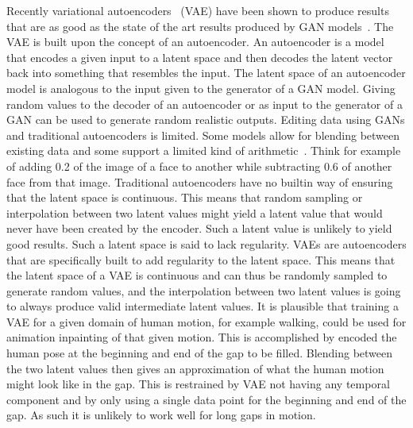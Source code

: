 Recently variational autoencoders~\cite{kingma2014autoencoding} (VAE) have been shown to produce results that are as good as the state of the art results produced by GAN models~\cite{razavi2019generating}. The VAE is built upon the concept of an autoencoder. An autoencoder is a model that encodes a given input to a latent space and then decodes the latent vector back into something that resembles the input. The latent space of an autoencoder model is analogous to the input given to the generator of a GAN model. Giving random values to the decoder of an autoencoder or as input to the generator of a GAN can be used to generate random realistic outputs. Editing data using GANs and traditional autoencoders is limited. Some models allow for blending between existing data and some support a limited kind of arithmetic~\cite{karras2019stylebased}. Think for example of adding 0.2 of the image of a face to another while subtracting 0.6 of another face from that image. Traditional autoencoders have no builtin way of ensuring that the latent space is continuous. This means that random sampling or interpolation between two latent values might yield a latent value that would never have been created by the encoder. Such a latent value is unlikely to yield good results. Such a latent space is said to lack regularity. VAEs are autoencoders that are specifically built to add regularity to the latent space. This means that the latent space of a VAE is continuous and can thus be randomly sampled to generate random values, and the interpolation between two latent values is going to always produce valid intermediate latent values. It is plausible that training a VAE for a given domain of human motion, for example walking, could be used for animation inpainting of that given motion. This is accomplished by encoded the human pose at the beginning and end of the gap to be filled. Blending between the two latent values then gives an approximation of what the human motion might look like in the gap. This is restrained by VAE not having any temporal component and by only using a single data point for the beginning and end of the gap. As such it is unlikely to work well for long gaps in motion.

